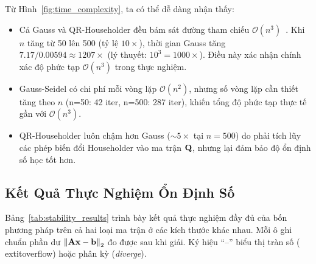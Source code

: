 Từ Hình~\ref{fig:time_complexity}, ta có thể dễ dàng nhận thấy:
\begin{itemize}
    \item Cả Gauss và QR-Householder đều bám sát đường tham chiếu $\mathcal{O}(n^3)$~\cite{golub2013}. Khi $n$ tăng từ 50 lên 500 (tỷ lệ $10\times$), thời gian Gauss tăng $7.17/0.00594 \approx 1207\times$ (lý thuyết: $10^3 = 1000\times$). Điều này xác nhận chính xác độ phức tạp $\mathcal{O}(n^3)$ trong thực nghiệm.
    \item Gauss-Seidel có chi phí mỗi vòng lặp $\mathcal{O}(n^2)$, nhưng số vòng lặp cần thiết tăng theo $n$ (n=50: 42 iter, n=500: 287 iter), khiến tổng độ phức tạp thực tế gần với $\mathcal{O}(n^3)$.
    \item QR-Householder luôn chậm hơn Gauss ($\sim 5\times$ tại $n=500$) do phải tích lũy các phép biến đổi Householder vào ma trận $\mathbf{Q}$, nhưng lại đảm bảo độ ổn định số học tốt hơn.
\end{itemize}

\subsection{Kết Quả Thực Nghiệm Ổn Định Số}

Bảng~\ref{tab:stability_results} trình bày kết quả thực nghiệm đầy đủ của bốn phương pháp trên cả hai loại ma trận ở các kích thước khác nhau. Mỗi ô ghi chuẩn phần dư $\left\lVert\mathbf{A}\mathbf{x}-\mathbf{b}\right\rVert_2$ đo được sau khi giải. Ký hiệu ``--'' biểu thị tràn số (	extit{overflow}) hoặc phân kỳ (\textit{diverge}).


